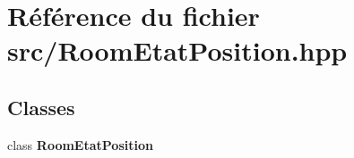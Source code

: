 \section{Référence du fichier src/\-Room\-Etat\-Position.hpp}
\label{_room_etat_position_8hpp}
\subsection*{Classes}
\begin{DoxyCompactItemize}
\item 
class {\bf Room\-Etat\-Position}
\end{DoxyCompactItemize}
